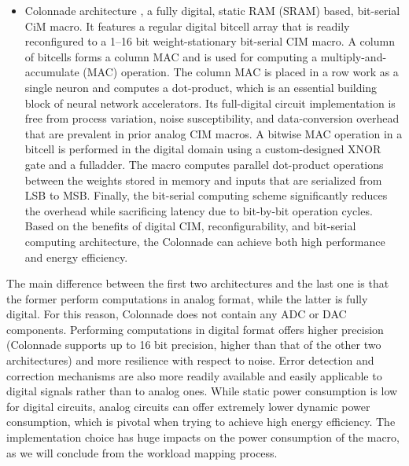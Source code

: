 \documentclass[conference]{IEEEtran}
\begin{document}
\begin{itemize}
    \item Colonnade architecture \cite{kim2021colonnade}, a fully digital, static RAM (SRAM) based, bit-serial CiM macro. It features a regular digital bitcell array that is readily reconﬁgured to a 1–16 bit weight-stationary bit-serial CIM macro. A column of bitcells forms a column MAC and is used for computing a multiply-and-accumulate (MAC) operation. The column MAC is placed in a row work as a single neuron and computes a dot-product, which is an essential building block of neural network accelerators. Its full-digital circuit implementation is free from process variation, noise susceptibility, and data-conversion overhead that are prevalent in prior analog CIM macros. A bitwise MAC operation in a bitcell is performed in the digital domain using a custom-designed XNOR gate and a fulladder. The macro computes parallel dot-product operations between the weights stored in memory and inputs that are serialized from LSB to MSB. Finally, the bit-serial computing scheme significantly reduces the overhead while sacrificing latency due to bit-by-bit operation cycles. Based on the benefits of digital CIM, reconfigurability, and bit-serial computing architecture, the Colonnade can achieve both high performance and energy efficiency.
\end{itemize}

The main difference between the first two architectures and the last one is that the former perform computations in analog format, while the latter is fully digital. For this reason, Colonnade does not contain any ADC or DAC components. Performing computations in digital format offers higher precision (Colonnade supports up to 16 bit precision, higher than that of the other two architectures) and more resilience with respect to noise. Error detection and correction mechanisms are also more readily available and easily applicable to digital signals rather than to analog ones. While static power consumption is low for digital circuits, analog circuits can offer extremely lower dynamic power consumption, which is pivotal when trying to achieve high energy efficiency. The implementation choice has huge impacts on the power consumption of the macro, as we will conclude from the workload mapping process.
\end{document}
